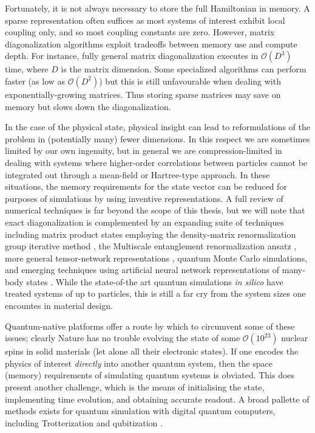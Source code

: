 	Fortunately, it is not always necessary to store the full Hamiltonian in memory.
	A sparse representation often suffices as most systems of interest exhibit local coupling only, and so most coupling constants are zero.
	However, matrix diagonalization algorithms exploit tradeoffs between memory use and compute depth.
	For instance, fully general matrix diagonalization executes in $\mathcal{O}(D^{3})$ time, where $D$ is the matrix dimension.
	Some specialized algorithms can perform faster (as low as $\mathcal{O}(D^{2})$) but this is still unfavourable when dealing with exponentially-growing matrices.
	Thus storing sparse matrices may save on memory but slows down the diagonalization.

	In the case of the physical state, physical insight can lead to reformulations of the problem in (potentially many) fewer dimensions.
	In this respect we are sometimes limited by our own ingenuity, but in general we are compression-limited in dealing with systems where higher-order correlations between particles cannot be integrated out through a mean-field or Hartree-type approach.
	In these situations, the memory requirements for the state vector can  be reduced for purposes of simulations by using inventive representations.
	A full review of numerical techniques is far beyond the scope of this thesis, but we will note that exact diagonalization \cite{Zhang10} is complemented by an expanding suite of techniques including matrix product states \cite{Schollwoeck11} employing the density-matrix renormalization group iterative method \cite{Dechiara08}, the Multiscale entanglement renormalization ansatz \cite{}, more general tensor-network representations \cite{}, quantum Monte Carlo simulations\cite{}, and emerging techniques using artificial neural network representations of many-body states \cite{}.
	While the state-of-the art quantum simulations \emph{in silico} have treated systems of up to \cite{how many?} particles, this is still a far cry from the system sizes one encountes in material design.

	Quantum-native platforms offer a route by which to circumvent some of these issues; clearly Nature has no trouble evolving the state of some $\mathcal{O}(10^{23})$ nuclear spins in solid materials (let alone all their electronic states).
	If one encodes the physics of interest \emph{directly} into another quantum system, then the space (memory) requirements of simulating quantum systems is obviated.
	This does present another challenge, which is the means of initialising the state, implementing time evolution, and obtaining accurate readout.
	A broad pallette of methods exists for quantum simulation with digital quantum computers, including Trotterization \cite{} and qubitization \cite{}.

